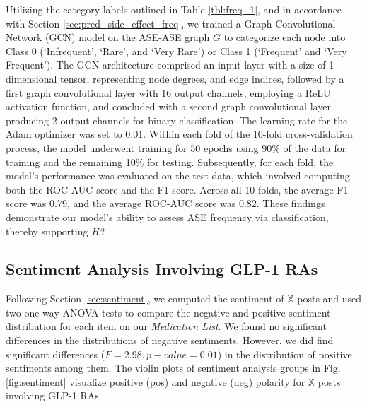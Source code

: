 \documentclass[referee,bst/sn-basic]{sn-jnl}%
\theoremstyle{thmstyletwo}%
\theoremstyle{thmstylethree}%
\begin{document}
Utilizing the category labels outlined in Table \ref{tbl:freq_1}, and in accordance with Section \ref{sec:pred_side_effect_freq}, we trained a Graph Convolutional Network (GCN) model on the ASE-ASE graph $G$ to categorize each node into Class 0 (`Infrequent', `Rare', and `Very Rare') or Class 1 (`Frequent' and `Very Frequent').
The GCN architecture comprised an input layer with a size of 1 dimensional tensor, representing node degrees, and edge indices, followed by a first graph convolutional layer with 16 output channels, employing a ReLU activation function, and concluded with a second graph convolutional layer producing 2 output channels for binary classification. 
The learning rate for the Adam optimizer was set to 0.01. 
Within each fold of the 10-fold cross-validation process, the model underwent training for 50 epochs using 90\% of the data for training and the remaining 10\% for testing. 
Subsequently, for each fold, the model's performance was evaluated on the test data, which involved computing both the ROC-AUC score and the F1-score.
Across all 10 folds, the average F1-score was 0.79, and the average ROC-AUC score was 0.82. 
These findings demonstrate our model's ability to assess ASE frequency via classification, thereby supporting \textit{H3}.

\subsection{Sentiment Analysis Involving GLP-1 RAs}
\label{subsec:sentiment}
\begin{comment}
{
    'Trulicity':'Dulaglutide',
    'Byetta':'Exenatide',
    'Bydureon':'Exenatide',
    'Victoza':'Liraglutide',
     Adlyxin':'Lixisenatide',
    'Ozempic':'Semaglutide',
    'Rybelsus: 'Semaglutide''
}
\end{comment}

Following Section \ref{sec:sentiment}, we computed the sentiment of $\mathbb{X}$ posts and used two one-way ANOVA tests to compare the negative and positive sentiment distribution for each item on our \textit{Medication List}. 
We found no significant differences in the distributions of negative sentiments. 
However, we did find significant differences ($F = 2.98, p-value= 0.01$) in the distribution of positive sentiments among them.
The violin plots of sentiment analysis groups in Fig. \ref{fig:sentiment} visualize positive (pos) and negative (neg) polarity for $\mathbb{X}$ posts involving GLP-1 RAs. 
\end{document}
